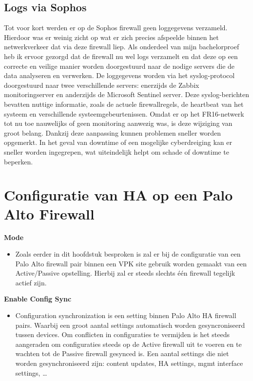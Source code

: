 \subsection{Logs via Sophos}
Tot voor kort werden er op de Sophos firewall geen loggegevens verzameld. Hierdoor was er weinig zicht op wat er zich precies afspeelde binnen het netwerkverkeer dat via deze firewall liep. Als onderdeel van mijn bachelorproef heb ik ervoor gezorgd dat de firewall nu wel logs verzamelt en dat deze op een correcte en veilige manier worden doorgestuurd naar de nodige servers die de data analyseren en verwerken.
De loggegevens worden via het syslog-protocol doorgestuurd naar twee verschillende servers: enerzijds de Zabbix monitoringserver en anderzijds de Microsoft Sentinel server. Deze syslog-berichten bevatten nuttige informatie, zoals de actuele firewallregels, de heartbeat van het systeem en verschillende systeemgebeurtenissen.
Omdat er op het FR16-netwerk tot nu toe nauwelijks of geen monitoring aanwezig was, is deze wijziging van groot belang. Dankzij deze aanpassing kunnen problemen sneller worden opgemerkt. In het geval van downtime of een mogelijke cyberdreiging kan er sneller worden ingegrepen, wat uiteindelijk helpt om schade of downtime te beperken.



\section{Configuratie van HA op een Palo Alto Firewall}

\textbf{Mode}
    \begin{itemize}[label=\textbullet]
        \item Zoals eerder in dit hoofdstuk besproken is zal er bij de configuratie van een Palo Alto firewall pair binnen een VPK site gebruik worden gemaakt van een Active/Passive opstelling. Hierbij zal er steeds slechts één firewall tegelijk actief zijn.
    \end{itemize}



\textbf{Enable Config Sync}
    \begin{itemize}[label=\textbullet]
        \item Configuration synchronization is een setting binnen Palo Alto HA firewall pairs. Waarbij een groot aantal settings automatisch worden gesyncroniseerd tussen devices. Om conflicten in configuraties te vermijden is het steeds aangeraden om configuraties steeds op de Active firewall uit te voeren en te wachten tot de Passive firewall gesynced is. Een aantal settings die niet worden gesynchroniseerd zijn: content updates, HA settings, mgmt interface settings, \ldots 
    \end{itemize}



